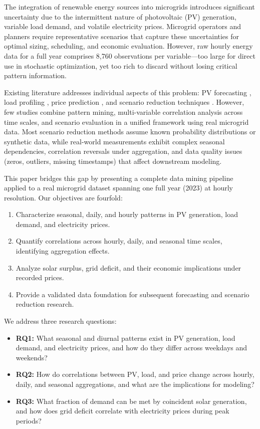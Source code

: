 \documentclass[conference]{IEEEtran}
\begin{document}
The integration of renewable energy sources into microgrids introduces significant uncertainty due to the intermittent nature of photovoltaic (PV) generation, variable load demand, and volatile electricity prices. Microgrid operators and planners require representative scenarios that capture these uncertainties for optimal sizing, scheduling, and economic evaluation. However, raw hourly energy data for a full year comprises 8,760 observations per variable—too large for direct use in stochastic optimization, yet too rich to discard without losing critical pattern information.

Existing literature addresses individual aspects of this problem: PV forecasting \cite{b1,b2,b9}, load profiling \cite{b3,b10}, price prediction \cite{b4,b11}, and scenario reduction techniques \cite{b5,b6,b12}. However, few studies combine pattern mining, multi-variable correlation analysis across time scales, and scenario evaluation in a unified framework using real microgrid data. Most scenario reduction methods assume known probability distributions or synthetic data, while real-world measurements exhibit complex seasonal dependencies, correlation reversals under aggregation, and data quality issues (zeros, outliers, missing timestamps) that affect downstream modeling.

This paper bridges this gap by presenting a complete data mining pipeline applied to a real microgrid dataset spanning one full year (2023) at hourly resolution. Our objectives are fourfold:
\begin{enumerate}
    \item Characterize seasonal, daily, and hourly patterns in PV generation, load demand, and electricity prices.
    \item Quantify correlations across hourly, daily, and seasonal time scales, identifying aggregation effects.
    \item Analyze solar surplus, grid deficit, and their economic implications under recorded prices.
    \item Provide a validated data foundation for subsequent forecasting and scenario reduction research.
\end{enumerate}

We address three research questions:
\begin{itemize}
    \item \textbf{RQ1:} What seasonal and diurnal patterns exist in PV generation, load demand, and electricity prices, and how do they differ across weekdays and weekends?
    \item \textbf{RQ2:} How do correlations between PV, load, and price change across hourly, daily, and seasonal aggregations, and what are the implications for modeling?
    \item \textbf{RQ3:} What fraction of demand can be met by coincident solar generation, and how does grid deficit correlate with electricity prices during peak periods?
\end{itemize}
\end{document}

